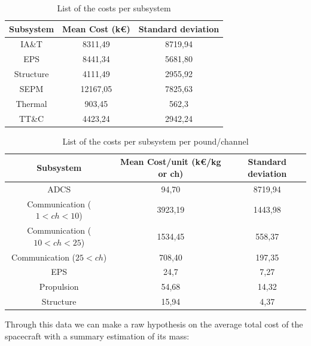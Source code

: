 \documentclass[11pt,a4paper,titlepage]{article}
\begin{document}
		\begin{table}
			\centering
			\begin{tabular}{ccc}
			\toprule
			Subsystem & Mean Cost (k\euro) & Standard deviation\\
			\midrule
			IA\&T     & 8311,49   & 8719,94\\
			EPS        & 8441,34   & 5681,80\\
			Structure & 4111,49   & 2955,92\\
			SEPM      & 12167,05 & 7825,63\\
			Thermal  & 903,45    & 562,3\\
			TT\&C    & 4423,24   & 2942,24\\ 
			\bottomrule
			\end{tabular}
			\caption{List of the costs per subsystem}
			\label{tab:systems1}
		\end{table}
		
		\begin{table}
			\centering
			\begin{tabular}{ccc}
			\toprule
			Subsystem & Mean Cost/unit (k\euro/kg or ch) & Standard deviation\\
			\midrule
			ADCS                                         & 94,70     & 8719,94\\
			Communication ($1 < ch < 10$)   & 3923,19 & 1443,98\\
			Communication ($10 < ch < 25$) & 1534,45 & 558,37\\
			Communication ($25 < ch$)         & 708,40   & 197,35\\
			EPS                                            & 24,7      & 7,27\\
			Propulsion                                  & 54,68     & 14,32\\
			Structure                                    & 15,94     & 4,37\\
			\bottomrule
			\end{tabular}
			\caption{List of the costs per subsystem per pound/channel}
			\label{tab:systems2}
		\end{table}
		
		Through this data we can make a raw hypothesis on the average total cost of the spacecraft with a summary estimation 			of its mass:
		
\end{document}
